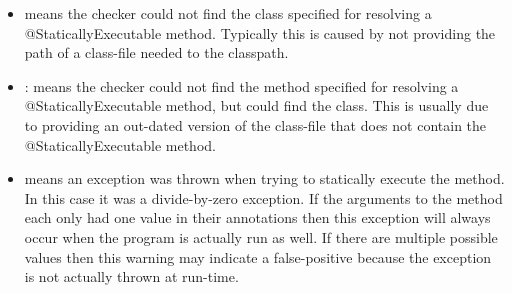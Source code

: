 \begin{itemize}
\item {}  means the checker could not find the class
  specified for resolving a @StaticallyExecutable method. Typically
  this is caused by not providing the path of a class-file needed to
  the classpath.
\item {}: means the checker could not
  find the method  specified for resolving a @StaticallyExecutable
  method, but could find the class. This is usually due to providing
  an out-dated version of the class-file that does not contain the
  @StaticallyExecutable method.
\item {} means an exception was thrown
  when trying to statically execute the method. In this case it was a
  divide-by-zero exception. If the arguments to the method each only
  had one value in their annotations then this exception will always
  occur when the program is actually run as well. If there are
  multiple possible values then this warning may indicate a
  false-positive because the exception is not actually thrown at
  run-time.

\end{itemize}


